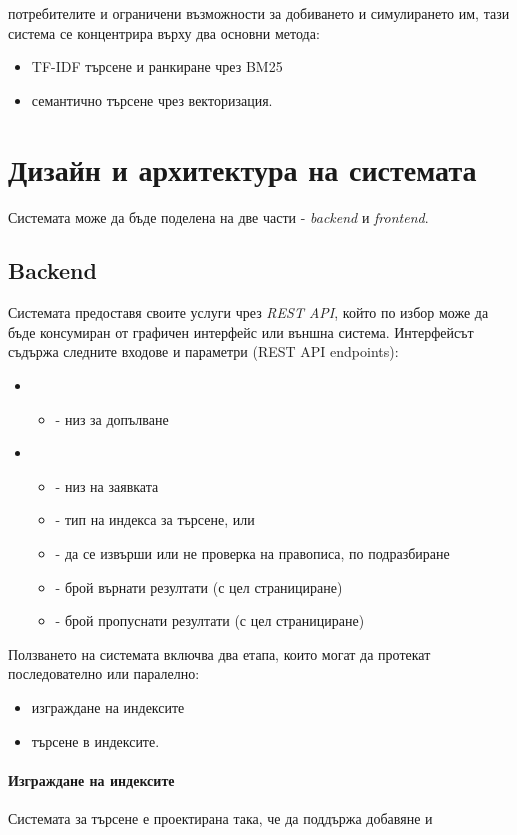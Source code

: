 \documentclass[a4paper,12pt]{article} \usepackage[utf8]{inputenc}
\begin{document}
потребителите и ограничени възможности за добиването и симулирането им, тази
система се концентрира върху два основни метода: \begin{itemize} \item TF-IDF
търсене и ранкиране чрез BM25 \item семантично търсене чрез векторизация.
\end{itemize} \newpage \section{Дизайн и архитектура на системата} Системата
може да бъде поделена на две части - \emph{backend} и \emph{frontend}.
\subsection{Backend} Системата предоставя своите услуги чрез \emph{REST API},
който по избор може да бъде консумиран от графичен интерфейс или външна система.
Интерфейсът съдържа следните входове и параметри (REST API endpoints):
\begin{itemize} \item {} \begin{itemize} \item {} - низ за
допълване \end{itemize} \item {} \begin{itemize} \item {} - низ на
заявката \item {} - тип на индекса за търсене,  или
 \item {} - да се извърши или не проверка на правописа,
по подразбиране  \item {} - брой върнати резултати (с цел
странициране) \item {} - брой пропуснати резултати (с цел странициране)
\end{itemize} \end{itemize} Ползването на системата включва два етапа, които
могат да протекат последователно или паралелно: \begin{itemize} \item изграждане
на индексите \item търсене в индексите. \end{itemize} \paragraph{Изграждане на
индексите} Системата за търсене е проектирана така, че да поддържа добавяне и
\end{document}
